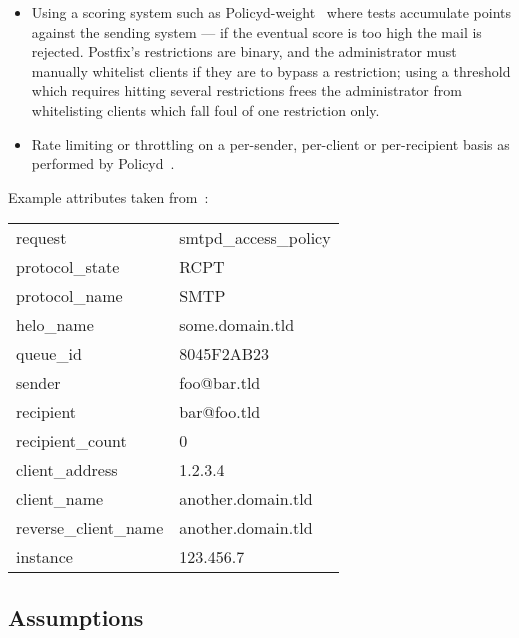 \documentclass[a4paper,12pt,draft]{article}
\begin{document}
\begin{itemize}
    \item Using a scoring system such as
        Policyd-weight~\cite{policyd-weight} where tests accumulate points
        against the sending system --- if the eventual score is too high
        the mail is rejected.  Postfix's restrictions are binary, and the
        administrator must manually whitelist clients if they are to bypass
        a restriction; using a threshold which requires hitting several
        restrictions frees the administrator from whitelisting clients
        which fall foul of one restriction only.

    \item Rate limiting or throttling on a per-sender, per-client or
        per-recipient basis as performed by Policyd~\cite{policyd}.

\end{itemize}

Example attributes taken from~\cite{policy-servers}:

\begin{tabular}[]{ll}

    request                 & smtpd\_access\_policy     \\
    protocol\_state         & RCPT                      \\
    protocol\_name          & SMTP                      \\
    helo\_name              & some.domain.tld           \\
    queue\_id               & 8045F2AB23                \\
    sender                  & foo@bar.tld               \\
    recipient               & bar@foo.tld               \\
    recipient\_count        & 0                         \\
    client\_address         & 1.2.3.4                   \\
    client\_name            & another.domain.tld        \\
    reverse\_client\_name   & another.domain.tld        \\
    instance                & 123.456.7                 \\

\end{tabular}



\subsection{Assumptions}
\end{document}
